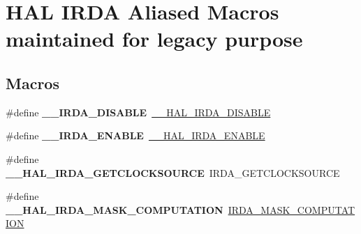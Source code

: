 \hypertarget{group___h_a_l___i_r_d_a___aliased___macros}{}\section{H\+AL I\+R\+DA Aliased Macros maintained for legacy purpose}
\label{group___h_a_l___i_r_d_a___aliased___macros}
\subsection*{Macros}
\begin{DoxyCompactItemize}
\item 
\mbox{\label{group___h_a_l___i_r_d_a___aliased___macros_gae107b46fa75a7f1f5eb0734cbb24e997}} 
\#define {\bfseries \+\_\+\+\_\+\+I\+R\+D\+A\+\_\+\+D\+I\+S\+A\+B\+LE}~\hyperlink{group___i_r_d_a___exported___macros_gaf049a81f535415532182a2bb10cbee1d}{\+\_\+\+\_\+\+H\+A\+L\+\_\+\+I\+R\+D\+A\+\_\+\+D\+I\+S\+A\+B\+LE}
\item 
\mbox{\label{group___h_a_l___i_r_d_a___aliased___macros_ga30e950fea9b8b878eb721ef488572f93}} 
\#define {\bfseries \+\_\+\+\_\+\+I\+R\+D\+A\+\_\+\+E\+N\+A\+B\+LE}~\hyperlink{group___i_r_d_a___exported___macros_ga94d14e3105494108f4ba6f69aa1728a7}{\+\_\+\+\_\+\+H\+A\+L\+\_\+\+I\+R\+D\+A\+\_\+\+E\+N\+A\+B\+LE}
\item 
\mbox{\label{group___h_a_l___i_r_d_a___aliased___macros_ga914579d3d8a0ebefab093a54a60bdef4}} 
\#define {\bfseries \+\_\+\+\_\+\+H\+A\+L\+\_\+\+I\+R\+D\+A\+\_\+\+G\+E\+T\+C\+L\+O\+C\+K\+S\+O\+U\+R\+CE}~I\+R\+D\+A\+\_\+\+G\+E\+T\+C\+L\+O\+C\+K\+S\+O\+U\+R\+CE
\item 
\mbox{\label{group___h_a_l___i_r_d_a___aliased___macros_ga5dfede2931b25ae470e8b9222cd7f276}} 
\#define {\bfseries \+\_\+\+\_\+\+H\+A\+L\+\_\+\+I\+R\+D\+A\+\_\+\+M\+A\+S\+K\+\_\+\+C\+O\+M\+P\+U\+T\+A\+T\+I\+ON}~\hyperlink{group___i_r_d_a_ex___private___macros_gab905bc46038b12561969148fa4929888}{I\+R\+D\+A\+\_\+\+M\+A\+S\+K\+\_\+\+C\+O\+M\+P\+U\+T\+A\+T\+I\+ON}
\item 
\mbox{\label{group___h_a_l___i_r_d_a___aliased___macros_ga91d8bac965400b5b1e0a9be356a9e477}} 

\end{DoxyCompactItemize}
